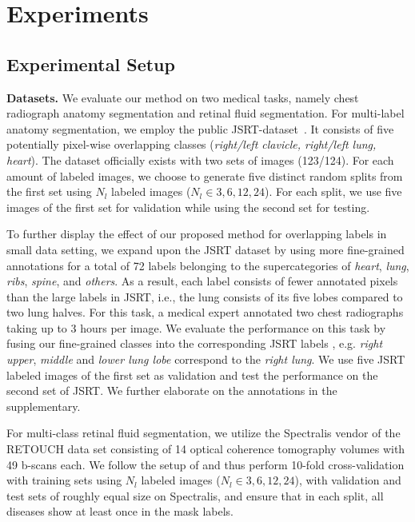 \documentclass[letterpaper]{article} %
\begin{document}
\section{Experiments}
\subsection{Experimental Setup}
\noindent\textbf{Datasets.}  We evaluate our method on two medical tasks, namely chest radiograph anatomy segmentation and retinal fluid segmentation. For multi-label anatomy segmentation, we employ the public JSRT-dataset~\cite{jsrt}. It consists of five potentially pixel-wise overlapping classes (\textit{right/left clavicle, right/left lung, heart}). The dataset officially exists with two sets of images (123/124). For each amount of labeled images, we choose to generate five distinct random splits from the first set using $N_l$ labeled images ($N_l\in{3,6,12,24}$).
For each split, we use five images of the first set for validation while using the second set for testing.

To further display the effect of our proposed method for overlapping labels in small data setting, we expand upon the JSRT dataset by using more fine-grained annotations for a total of 72 labels belonging to the supercategories of \textit{heart}, \textit{lung}, \textit{ribs}, \textit{spine}, and \textit{others}. As a result, each label consists of fewer annotated pixels than the large labels in JSRT, i.e., the lung consists of its five lobes compared to two lung halves.
For this task, a medical expert annotated two chest radiographs taking up to 3 hours per image.
We evaluate the performance on this task by fusing our fine-grained classes into the corresponding JSRT labels , e.g. \textit{right upper}, \textit{middle} and \textit{lower lung lobe} correspond to the \textit{right lung}. We use five JSRT labeled images of the first set as validation and test the performance on the second set of JSRT. We further elaborate on the annotations in the supplementary.

For multi-class retinal fluid segmentation, we utilize the Spectralis vendor of the RETOUCH data set consisting of 14 optical coherence tomography volumes with 49 b-scans each. We follow the setup of \cite{reiss2021every} and thus perform 10-fold cross-validation with training sets using $N_l$ labeled images ($N_l\in{3,6,12,24}$), with validation and test sets of roughly equal size on Spectralis, and ensure that in each split, all diseases show at least once in the mask labels.
\end{document}
